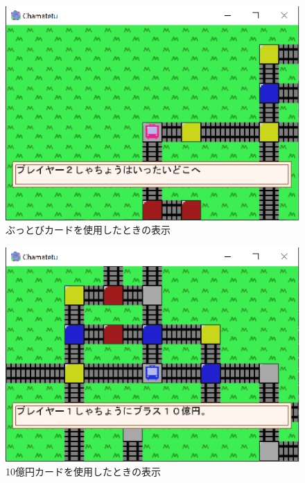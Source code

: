 \documentclass[a4j]{jarticle}
\begin{document}
        \begin{figure}[H]
            \centering
            \includegraphics[scale=1.3]{buttobi.eps}
            \caption{ぶっとびカードを使用したときの表示}
             \label{c5}
            \end{figure}

        \begin{figure}[H]
            \centering
            \includegraphics[scale=1.3]{tenoku.eps}
            \caption{10億円カードを使用したときの表示}
             \label{c6}
            \end{figure}
\end{document}
